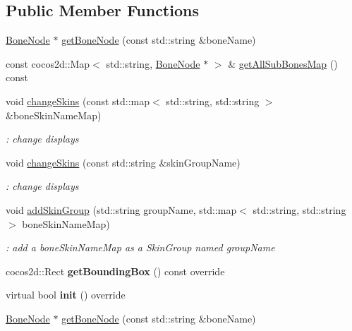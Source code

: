 \subsection*{Public Member Functions}
\begin{DoxyCompactItemize}
\item 
\hyperlink{classBoneNode}{Bone\+Node} $\ast$ \hyperlink{classSkeletonNode_a96e22a99becb19c489d99dd3957e06a4}{get\+Bone\+Node} (const std\+::string \&bone\+Name)
\item 
const cocos2d\+::\+Map$<$ std\+::string, \hyperlink{classBoneNode}{Bone\+Node} $\ast$ $>$ \& \hyperlink{classSkeletonNode_a1a1a0f5338469b1cfc12e51d393c333d}{get\+All\+Sub\+Bones\+Map} () const
\item 
void \hyperlink{classSkeletonNode_a29dd03517b18a7d12f50542ddf3f42f2}{change\+Skins} (const std\+::map$<$ std\+::string, std\+::string $>$ \&bone\+Skin\+Name\+Map)
\begin{DoxyCompactList}\small\item\em \+: change displays \end{DoxyCompactList}\item 
void \hyperlink{classSkeletonNode_af9f13ad397a5d190500224d2ab510324}{change\+Skins} (const std\+::string \&skin\+Group\+Name)
\begin{DoxyCompactList}\small\item\em \+: change displays \end{DoxyCompactList}\item 
void \hyperlink{classSkeletonNode_ae4cfa9a616beff4fac44faca5bced45b}{add\+Skin\+Group} (std\+::string group\+Name, std\+::map$<$ std\+::string, std\+::string $>$ bone\+Skin\+Name\+Map)
\begin{DoxyCompactList}\small\item\em \+: add a bone\+Skin\+Name\+Map as a Skin\+Group named group\+Name \end{DoxyCompactList}\item 
\mbox{\label{classSkeletonNode_ac70f988a43f624a68e6006eabe176f18}} 
cocos2d\+::\+Rect {\bfseries get\+Bounding\+Box} () const override
\item 
\mbox{\label{classSkeletonNode_ae4c87474e9d0db4813d333514871aca5}} 
virtual bool {\bfseries init} () override
\item 
\hyperlink{classBoneNode}{Bone\+Node} $\ast$ \hyperlink{classSkeletonNode_a0ca6101678f33f472a52fd9cdad17066}{get\+Bone\+Node} (const std\+::string \&bone\+Name)

\end{DoxyCompactItemize}
